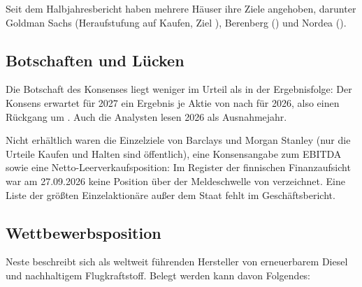 Seit dem Halbjahresbericht haben mehrere H\"auser ihre Ziele angehoben, darunter Goldman
Sachs (Heraufstufung auf Kaufen, Ziel ), Berenberg
() und Nordea ().

\subsection{Botschaften und L\"ucken}

Die Botschaft des Konsenses liegt weniger im Urteil als in der Ergebnisfolge: Der Konsens
erwartet f\"ur 2027 ein Ergebnis je Aktie von  nach
 f\"ur 2026, also einen R\"uckgang um \EpsRueckgangXXVII. Auch die Analysten lesen 2026
als Ausnahmejahr.

Nicht erh\"altlich waren die Einzelziele von Barclays und Morgan Stanley (nur die Urteile
Kaufen und Halten sind \"offentlich), eine Konsensangabe zum EBITDA sowie eine
Netto-Leerverkaufsposition: Im Register der finnischen Finanzaufsicht war am 27.09.2026 keine
Position \"uber der Meldeschwelle von \Pz{\ShortSchwelle} verzeichnet.
Eine Liste der gr\"o{\ss}ten Einzelaktion\"are au{\ss}er dem Staat fehlt im Gesch\"aftsbericht.

\subsection{Wettbewerbsposition}

Neste beschreibt sich als weltweit f\"uhrenden Hersteller von erneuerbarem Diesel und
nachhaltigem Flugkraftstoff. Belegt werden kann davon Folgendes:

